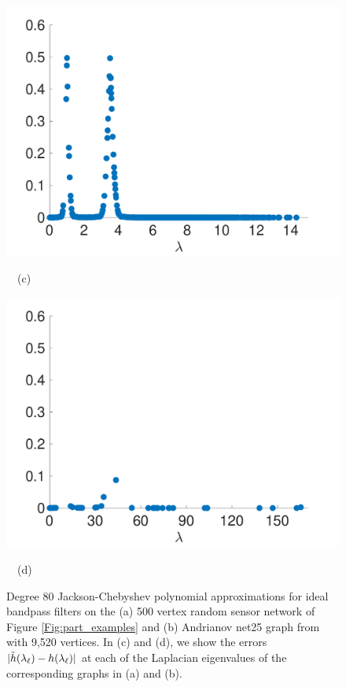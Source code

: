 \documentclass[journal, 10pt]{IEEEtran}
\begin{document}
\begin{figure}[tbh]
\begin{minipage}[m]{0.49\linewidth}
\centerline{\includegraphics[width=1.1\linewidth]{fig_approx_filter_sensor_error}}
\centerline{~~\small{(c)}}
\end{minipage}
\begin{minipage}[m]{0.49\linewidth}
\centerline{\includegraphics[width=1.1\linewidth]{fig_approx_filter_net25_error}}
\centerline{~~\small{(d)}}
\end{minipage}
\caption{Degree 80 Jackson-Chebyshev polynomial approximations for ideal bandpass filters on the (a) 500 vertex random sensor network of Figure \ref{Fig:part_examples} and (b) Andrianov net25 graph from \cite{davis2011university} with 9,520 vertices. In (c) and (d), we show the errors $|\tilde{h}(\lambda_{\ell})-h(\lambda_{\ell})|$ at each of the Laplacian eigenvalues of the corresponding graphs in (a) and (b).}
\label{Fig:approx_filtering_error}
\end{figure}
\end{document}
